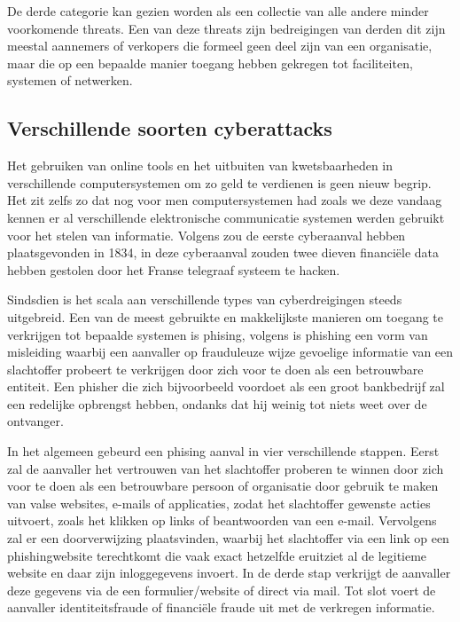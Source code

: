 De derde categorie kan gezien worden als een collectie van alle andere minder voorkomende threats. Een van deze threats zijn bedreigingen van derden dit zijn meestal aannemers of verkopers die formeel geen deel zijn van een organisatie, maar die op een bepaalde manier toegang hebben gekregen tot faciliteiten, systemen of netwerken. \autocite{Cisa2025}



\subsection{Verschillende soorten cyberattacks}
Het gebruiken van online tools en het uitbuiten van kwetsbaarheden in verschillende computersystemen om zo geld te verdienen is geen nieuw begrip. Het zit zelfs zo dat nog voor men computersystemen had zoals we deze vandaag kennen er al verschillende elektronische communicatie systemen werden gebruikt voor het stelen van informatie. Volgens \textcite{Monroe2025} zou de eerste cyberaanval hebben plaatsgevonden in 1834, in deze cyberaanval zouden twee dieven financiële data hebben gestolen door het Franse telegraaf systeem te hacken. 

Sindsdien is het scala aan verschillende types van cyberdreigingen steeds uitgebreid. Een van de meest gebruikte en makkelijkste manieren om toegang te verkrijgen tot bepaalde systemen is phising, volgens \textcite{jagatic2007} is phishing een vorm van misleiding waarbij een aanvaller op frauduleuze wijze gevoelige informatie van een slachtoffer probeert te verkrijgen door zich voor te doen als een betrouwbare entiteit. Een phisher die zich bijvoorbeeld voordoet als een groot bankbedrijf zal een redelijke opbrengst hebben, ondanks dat hij weinig tot niets weet over de ontvanger. 

In het algemeen gebeurd een phising aanval in vier verschillende stappen. Eerst zal de aanvaller het vertrouwen van het slachtoffer proberen te winnen door zich voor te doen als een betrouwbare persoon of organisatie door gebruik te maken van valse websites, e-mails of applicaties, zodat het slachtoffer gewenste acties uitvoert, zoals het klikken op links of beantwoorden van een e-mail. Vervolgens zal er een doorverwijzing plaatsvinden, waarbij het slachtoffer via een link op een phishingwebsite terechtkomt die vaak exact hetzelfde eruitziet al de legitieme website en daar zijn inloggegevens invoert. In de derde stap verkrijgt de aanvaller deze gegevens via de een formulier/website of direct via mail. Tot slot voert de aanvaller identiteitsfraude of financiële fraude uit met de verkregen informatie. \autocite{varshney2024}

